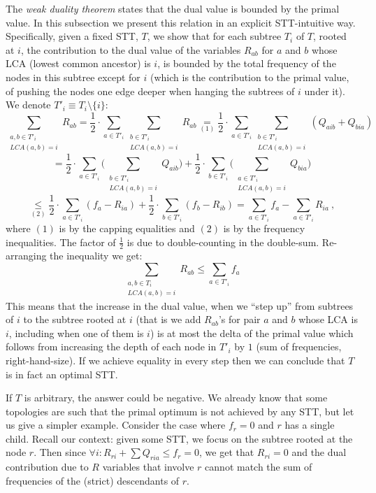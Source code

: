 The \emph{weak duality theorem} states that the dual value is bounded by the primal value. In this subsection we present this relation in an explicit STT-intuitive way. Specifically, given a fixed STT, $T$, we show that for each subtree $T_i$ of $T$, rooted at $i$, the contribution to the dual value of the variables $R_{ab}$ for $a$ and $b$ whose LCA (lowest common ancestor) is $i$, is bounded by the total frequency of the nodes in this subtree except for $i$ (which is the contribution to the primal value, of pushing the nodes one edge deeper when hanging the subtrees of $i$ under it). We denote $T'_i \equiv T_i \setminus\{i\}$:
$$ \sum_{\substack{a,b \in T'_i \\ LCA(a,b)=i}}{R_{ab}} =
\frac{1}{2} \cdot \sum_{a \in T'_i} \sum_{\substack{b \in T'_i \\ LCA(a,b)=i}} {R_{ab}}
\underset{(1)}{=} \frac{1}{2} \cdot \sum_{a \in T'_i} \sum_{\substack{b \in T'_i \\ LCA(a,b)=i}} {(Q_{aib} + Q_{bia})}
$$
$$
= \frac{1}{2} \cdot \sum_{a \in T'_i} \Big ( \sum_{\substack{b \in T'_i \\ LCA(a,b)=i}} {Q_{aib}} \Big ) + \frac{1}{2} \cdot \sum_{b \in T'_i} \Big ( \sum_{\substack{a \in T'_i \\ LCA(a,b)=i}} {Q_{bia}} \Big )
$$
$$
\underset{(2)}{\le} \frac{1}{2} \cdot \sum_{a \in T'_i}{(f_a - R_{ia})} + \frac{1}{2} \cdot \sum_{b \in T'_i}{(f_b - R_{ib})}
= \sum_{a \in T'_i}{f_a} - \sum_{a \in T'_i}{R_{ia}} \ ,
$$
where $(1)$ is by the capping equalities and $(2)$ is by the frequency inequalities. The factor of $\frac{1}{2}$ is due to double-counting in the double-sum. Re-arranging the inequality we get:
$$ \sum_{\substack{a,b \in T_i \\ LCA(a,b)=i}}{R_{ab}} \le \sum_{a \in T'_i}{f_a}
$$
This means that the increase in the dual value, when we ``step up'' from subtrees of $i$ to the subtree rooted at $i$ (that is we add $R_{ab}$'s for pair $a$ and $b$ whose LCA is $i$, including when one of them is $i$) is at most the delta of the primal value which follows from increasing the depth of each node in $T'_i$ by $1$ (sum of frequencies, right-hand-size). If we achieve equality in every step then we can conclude that $T$ is in fact an optimal STT.

If $T$ is arbitrary, the answer could be negative. We already know that some topologies are such that the primal optimum is not achieved by any STT, but let us give a simpler example. Consider the case where $f_r = 0$ and $r$ has a single child. Recall our context: given some STT, we focus on the subtree rooted at the node $r$. Then since $\forall i: R_{ri} + \sum{Q_{ria}} \le f_r = 0$, we get that $R_{ri} = 0$ and the dual contribution due to $R$ variables that involve $r$ cannot match the sum of frequencies of the (strict) descendants of $r$.

